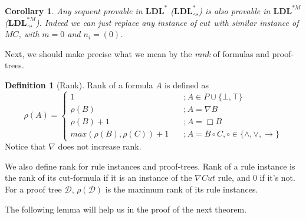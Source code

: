 \documentclass[12pt,a4paper]{article}
\theoremstyle{plain}
\newtheorem{cor}[thm]{Corollary}
\theoremstyle{definition}
\newtheorem{dfn}[thm]{Definition}
\begin{document}
\begin{cor}\label{cor:mc-riddance} Any sequent provable in $\mathbf{LDL}^*$ ($\mathbf{LDL}^*_{\rightsquigarrow}$) is also provable in $\mathbf{LDL}^{*M}$ ($\mathbf{LDL}^{*M}_{\rightsquigarrow}$). Indeed we can just replace any instance of $cut$ with similar instance of $MC$, with $m = 0$ and $n_i = (0)$.
\end{cor}

Next, we should make precise what we mean by the \emph{rank} of formulas and proof-trees.

\begin{dfn}[Rank]
	Rank of a formula $A$ is defined as
	\[ \rho(A) = \begin{cases}
	1 & \quad ; A \in P \cup \{ \bot, \top \} \\
	\rho(B) & \quad ; A = \nabla B \\
	\rho(B) + 1 & \quad ; A = \Box B \\
	max(\rho(B), \rho(C)) + 1 & \quad ; A = B \circ C, \circ \in \{ \land , \lor, \rightarrow \}
	\end{cases} \]
	Notice that $\nabla$ does not increase rank.
	
	We also define rank for rule instances and proof-trees. Rank of a rule instance is the rank of its cut-formula if it is an instance of the $\nabla Cut$ rule, and $0$ if it's not.
	For a proof tree $\mathcal{D}$, $\rho(\mathcal{D})$ is the maximum rank of its rule instances.
\end{dfn}

The following lemma will help us in the proof of the next theorem.
\end{document}

